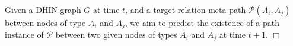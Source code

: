 \begin{definition}\label{problemdef}Given a DHIN graph $G$ at time $t$, and a target relation meta path $\mathcal{P}(A_i,A_j)$ between nodes of type $A_i$ and $A_j$, we aim to predict the existence of a path instance of $\mathcal{P}$ between two given nodes of types $A_i$ and $A_j$ at time $t+1$. $\Box$ \end{definition}


%



%
%
%





